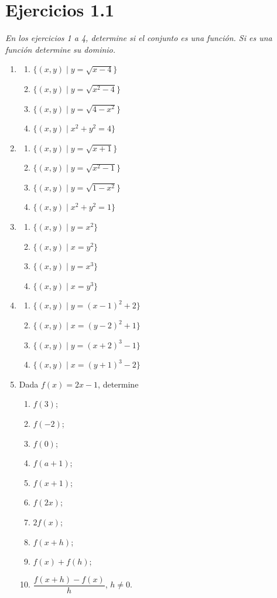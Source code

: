\documentclass[12pt]{article}
\theoremstyle{remark}
\begin{document}
\section*{Ejercicios 1.1}

\textit{En los ejercicios 1 a 4, determine si el conjunto es una función. Si es una función determine su dominio.}

\begin{enumerate}
\item
\begin{enumerate}[label=(\alph*)]
\item $\{(x,y)\mid y=\sqrt{x-4}\}$
\item $\{(x,y)\mid y=\sqrt{x^2-4}\}$
\item $\{(x,y)\mid y=\sqrt{4-x^2}\}$
\item $\{(x,y)\mid x^2+y^2=4\}$
\end{enumerate}

\item
\begin{enumerate}[label=(\alph*)]
\item $\{(x,y)\mid y=\sqrt{x+1}\}$
\item $\{(x,y)\mid y=\sqrt{x^2-1}\}$
\item $\{(x,y)\mid y=\sqrt{1-x^2}\}$
\item $\{(x,y)\mid x^2+y^2=1\}$
\end{enumerate}

\item
\begin{enumerate}[label=(\alph*)]
\item $\{(x,y)\mid y=x^2\}$
\item $\{(x,y)\mid x=y^2\}$
\item $\{(x,y)\mid y=x^3\}$
\item $\{(x,y)\mid x=y^3\}$
\end{enumerate}

\item
\begin{enumerate}[label=(\alph*)]
\item $\{(x,y)\mid y=(x-1)^2+2\}$
\item $\{(x,y)\mid x=(y-2)^2+1\}$
\item $\{(x,y)\mid y=(x+2)^3-1\}$
\item $\{(x,y)\mid x=(y+1)^3-2\}$
\end{enumerate}

\item Dada $f(x)=2x-1$, determine
\begin{enumerate}[label=(\alph*)]
\item $f(3)$; \item $f(-2)$; \item $f(0)$; \item $f(a+1)$; \item $f(x+1)$;
\item $f(2x)$; \item $2f(x)$; \item $f(x+h)$; \item $f(x)+f(h)$;
\item $\dfrac{f(x+h)-f(x)}{h}$, $h\ne0$.
\end{enumerate}


\end{enumerate}
\end{document}
